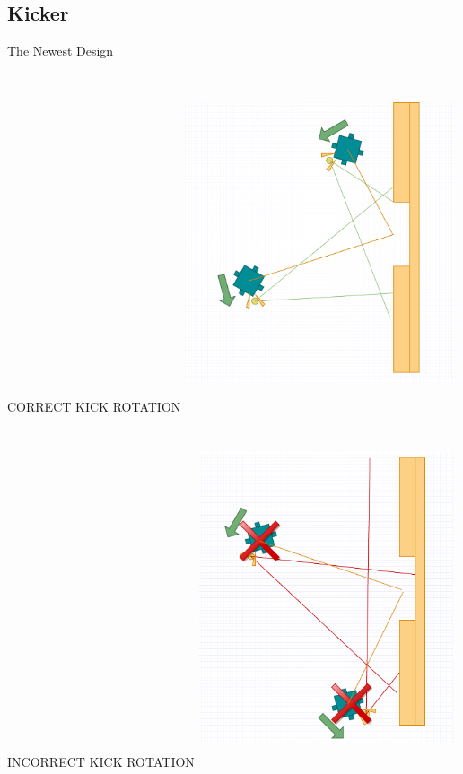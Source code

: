 \documentclass[a4paper,12pt]{article}
\begin{document}
\subsection{Kicker}
The Newest Design\newline\newline
\begin{minipage}{0.5\textwidth}
CORRECT KICK ROTATION\newline
\includegraphics[width=80mm,height=100mm]{goodkick.png}\newline
\end{minipage}
\hspace{.2cm}
\begin{minipage}{0.5\textwidth}
INCORRECT KICK ROTATION\newline
\includegraphics[width=75mm,height=100mm]{badkick.png}\newline
\end{minipage}
\end{document}
